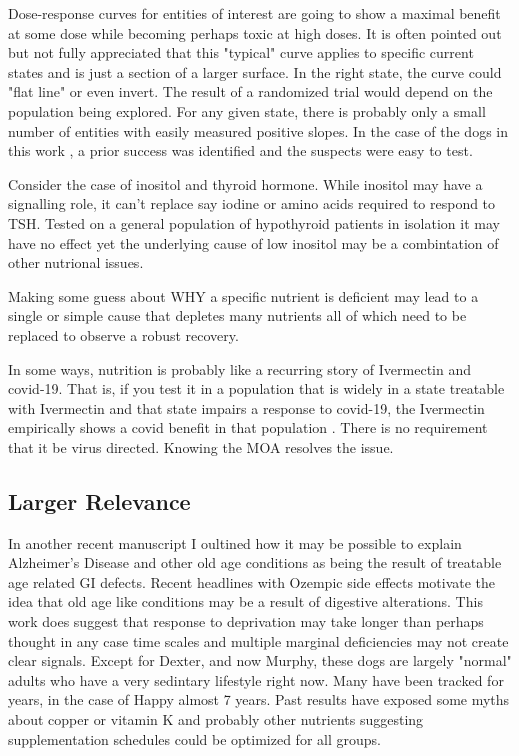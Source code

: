 Dose-response curves for entities of interest are going to 
show a maximal benefit at some dose while becoming perhaps
toxic at high doses. It is often pointed out but not fully 
appreciated that this "typical" curve applies to specific
current states and is just a section of a larger surface.
In the right state, the curve could "flat line" or even invert.
The result of a randomized trial would depend on the population
being explored.  For any given state, there is probably only
a small number of entities with easily measured positive slopes.
In the  case of the dogs in this work , a prior success 
was identified and the suspects were easy to test. 

Consider the case of inositol and thyroid hormone. While inositol
may have a signalling role, it can't replace say iodine or amino
acids required to respond to TSH.  Tested on a general population
of hypothyroid patients in isolation it may have no effect yet
the underlying cause of low inositol may be a combintation
of other nutrional issues.  

Making some guess about WHY a specific nutrient is deficient
may lead to a single or simple cause that depletes many
nutrients all of which need to be replaced to observe a
robust recovery. 

In some ways, nutrition is probably like a recurring story of 
Ivermectin and
covid-19. That is, if you test it in a population that is widely
in a state treatable with Ivermectin  and that state impairs
a response to covid-19, the Ivermectin empirically shows a covid
benefit in that population
\cite{marchywka-MJM-2022-011-0.50}
. There is no requirement that it be virus directed.
Knowing the MOA resolves the issue.


\subsection{Larger Relevance }
In another recent manuscript\cite{marchywka-MJM-2026-001-0.001}
I oultined how it may be possible to explain Alzheimer's Disease
and other old age conditions as being the result of treatable
age related GI defects. Recent headlines with Ozempic side effects
motivate the idea that old age like conditions may be a result of
digestive alterations. This work does suggest that response to
deprivation may take longer than perhaps thought in any case
time scales and multiple marginal deficiencies may not 
create clear signals. 
Except for Dexter, and now Murphy, these dogs are largely "normal"
adults who have a very sedintary lifestyle right now. 
Many have been tracked for years, in the case of Happy almost
7 years. Past results have exposed some myths about copper
\cite{marchywka-MJM-2024-010-0.01rg}
 or  
vitamin K   
\cite{mmarchywka-MJM-2021-003-v0.50rg}
and probably other
nutrients suggesting supplementation  schedules could be optimized
for all groups.  

